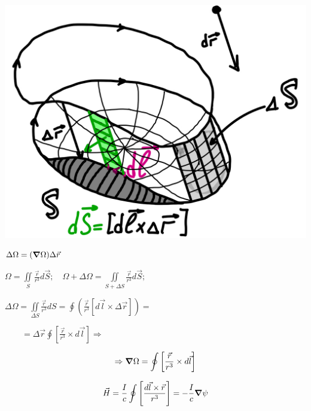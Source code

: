 \begin{minipage}[c]{0.4\textwidth} %
    \includegraphics[width=\textwidth]{im/65.png}{} %
\end{minipage}%
\hfill
\begin{minipage}[c]{0.55\textwidth} %
    \( \Delta\Omega =(\grad\Omega)\Delta \vec{r} \) 

    \( \Omega= \underset{S}{\iint}\frac{\vec{r}}{r^3}d\vec{S};\quad \Omega+\Delta\Omega =\underset{S+\Delta S}{\iint} \frac{\vec{r}}{r^3}d\vec{S};  \)
    
    \( \Delta\Omega= \underset{\Delta S}{\iint} \frac{\vec{r}}{r^3}dS= \oint \left( \frac{\vec{r}}{r^3}[d\vec{l}\times \Delta\vec{r}]  \right)=  \)

    \(\qquad = \Delta\vec{r} \oint \left[ \frac{\vec{r}}{r^3}\times d\vec{l}  \right] \Rightarrow   \) 
\end{minipage}

\[
\Rightarrow \grad\Omega=\oint \left[ \frac{\vec{r}}{r^3}\times d\vec{l}  \right]
\]

\[
\vec{H}=\frac{I}{c}\oint \left[ \frac{d\vec{l} \times \vec{r}}{r^3}  \right] = -\frac{I}{c} \grad \psi
\]